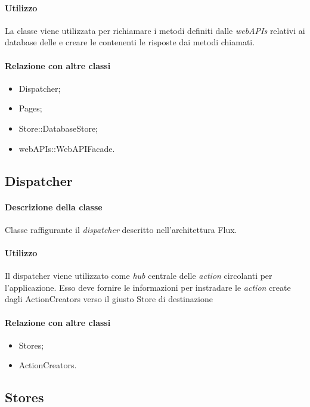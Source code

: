 \paragraph*{Utilizzo}
La classe viene utilizzata per richiamare i metodi definiti dalle \textit{webAPIs} relativi ai database delle  e creare le  contenenti le risposte dai metodi chiamati.
\paragraph*{Relazione con altre classi}
\begin{itemize}
\item Dispatcher;
\item Pages;
\item Store::DatabaseStore;
\item webAPIs::WebAPIFacade.
\end{itemize}

\subsection{Dispatcher}
\paragraph*{Descrizione della classe}
Classe raffigurante il \textit{dispatcher} descritto nell'architettura Flux.
\paragraph*{Utilizzo}
Il dispatcher viene utilizzato come \textit{hub} centrale delle \textit{action} circolanti per l'applicazione. Esso deve fornire le informazioni per instradare le \textit{action} create dagli ActionCreators verso il giusto Store di destinazione
\paragraph*{Relazione con altre classi}
\begin{itemize}
\item Stores;
\item ActionCreators.
\end{itemize}


\subsection{Stores}

